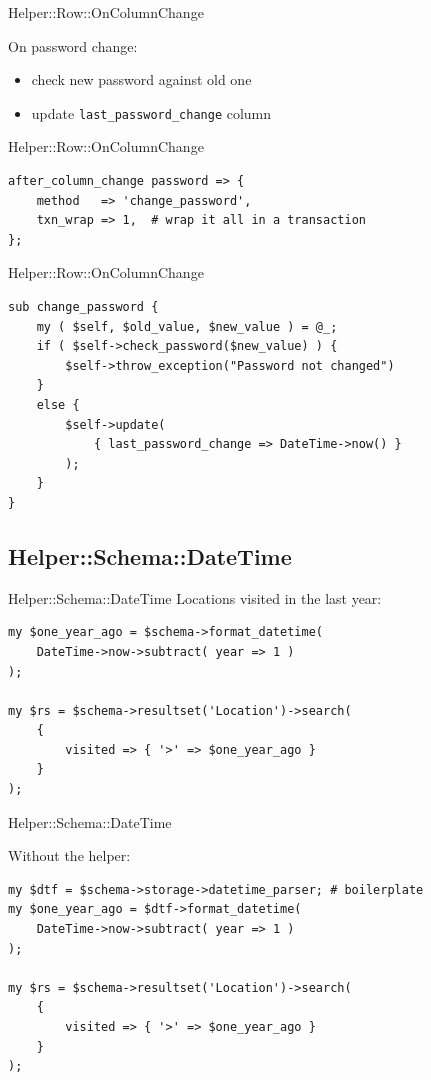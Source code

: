 \begin{frame}[fragile]{Helper::Row::OnColumnChange}

On password change:

\begin{itemize}
\item check new password against old one
\item update \verb|last_password_change| column
\end{itemize}

\end{frame}

\begin{frame}[fragile]{Helper::Row::OnColumnChange}
\begin{lstlisting}
after_column_change password => {
    method   => 'change_password',
    txn_wrap => 1,  # wrap it all in a transaction
};
\end{lstlisting}
\end{frame}

\begin{frame}[fragile]{Helper::Row::OnColumnChange}
\begin{lstlisting}
sub change_password {
    my ( $self, $old_value, $new_value ) = @_;
    if ( $self->check_password($new_value) ) {
        $self->throw_exception("Password not changed")
    }
    else {
        $self->update(
            { last_password_change => DateTime->now() }
        );
    }
}
\end{lstlisting}
\end{frame}

\subsection{Helper::Schema::DateTime}

\begin{frame}[fragile]{Helper::Schema::DateTime}
Locations visited in the last year:

\begin{lstlisting}
my $one_year_ago = $schema->format_datetime(
    DateTime->now->subtract( year => 1 )
);

my $rs = $schema->resultset('Location')->search(
    {
        visited => { '>' => $one_year_ago }
    }
);
\end{lstlisting}
\end{frame}

\begin{frame}[fragile]{Helper::Schema::DateTime}

Without the helper:

\begin{lstlisting}
my $dtf = $schema->storage->datetime_parser; # boilerplate
my $one_year_ago = $dtf->format_datetime(
    DateTime->now->subtract( year => 1 )
);

my $rs = $schema->resultset('Location')->search(
    {
        visited => { '>' => $one_year_ago }
    }
);
\end{lstlisting}
\end{frame}

